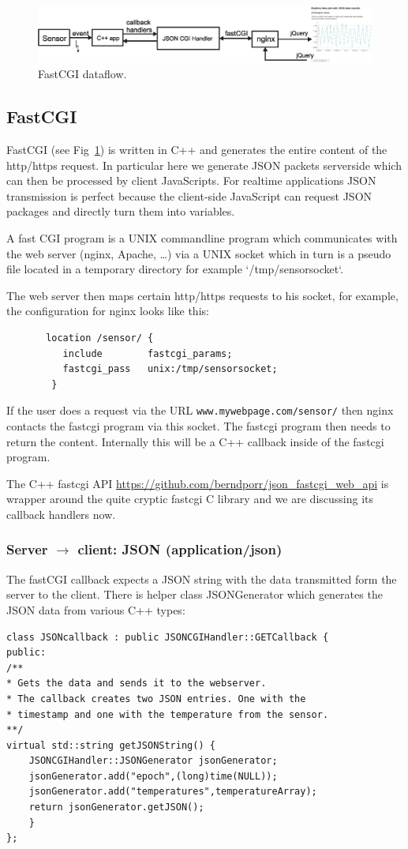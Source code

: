 \documentclass[12pt]{report}
\begin{document}
\begin{figure}[h]
\begin{center}
\includegraphics[width=\linewidth]{restdataflow}
\end{center}
\caption{FastCGI dataflow.\label{cgi}}
\end{figure}

\subsection{FastCGI}
FastCGI (see Fig~\ref{cgi}) is written in C++ and generates the entire
content of the http/https request. In particular here we generate
JSON packets serverside which can then be processed by client JavaScripts.
For realtime applications JSON transmission is perfect because the client-side
JavaScript can request JSON packages and directly turn them into variables.

A fast CGI program is a UNIX commandline program which communicates with the web server
(nginx, Apache, \ldots) via a UNIX socket which in turn is a pseudo file located
in a temporary directory for example `/tmp/sensorsocket`.

The web server then maps certain http/https requests to
his socket, for example, the configuration for nginx looks like this:
\begin{verbatim}
       location /sensor/ {
          include        fastcgi_params;
          fastcgi_pass   unix:/tmp/sensorsocket;
        }
\end{verbatim}
If the user does a request via the URL \texttt{www.mywebpage.com/sensor/} then
nginx contacts the fastcgi program via this socket. The fastcgi program
then needs to return the content. Internally this will be a C++ callback
inside of the fastcgi program.

The C++ fastcgi API \url{https://github.com/berndporr/json_fastcgi_web_api} 
is wrapper around the quite cryptic fastcgi C library and we are discussing
its callback handlers now.

\subsubsection{Server $\to$ client: JSON (application/json)}
The fastCGI callback expects a JSON string with the data
transmitted form the server to the client. There is helper
class JSONGenerator which generates the JSON data from various
C++ types:
\begin{verbatim}
class JSONcallback : public JSONCGIHandler::GETCallback {
public:
/**
* Gets the data and sends it to the webserver.
* The callback creates two JSON entries. One with the
* timestamp and one with the temperature from the sensor.
**/
virtual std::string getJSONString() {
    JSONCGIHandler::JSONGenerator jsonGenerator;
    jsonGenerator.add("epoch",(long)time(NULL));
    jsonGenerator.add("temperatures",temperatureArray);
    return jsonGenerator.getJSON();
    }
};
\end{verbatim} 
\end{document}
